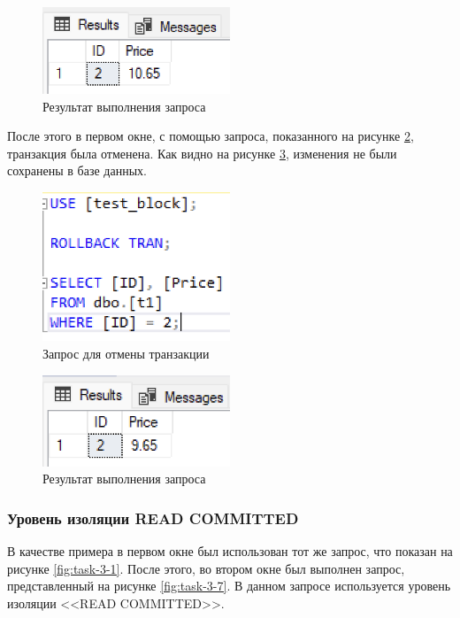 \documentclass[a4paper, 14pt]{extarticle}
\begin{document}
\begin{figure}[H]
  \centering
  \includegraphics[width=0.5\textwidth]{images/task-3/4.png}
  \caption{Результат выполнения запроса}
  \label{fig:task-3-4}
\end{figure}

После этого в первом окне, с помощью запроса, показанного на рисунке
\ref{fig:task-3-5}, транзакция была отменена. Как видно на рисунке
\ref{fig:task-3-6}, изменения не были сохранены в базе данных.

\begin{figure}[H]
  \centering
  \includegraphics[width=0.5\textwidth]{images/task-3/5.png}
  \caption{Запрос для отмены транзакции}
  \label{fig:task-3-5}
\end{figure}

\begin{figure}[H]
  \centering
  \includegraphics[width=0.5\textwidth]{images/task-3/6.png}
  \caption{Результат выполнения запроса}
  \label{fig:task-3-6}
\end{figure}

\subsubsection{Уровень изоляции READ COMMITTED}

В качестве примера в первом окне был использован тот же запрос, что показан на
рисунке \ref{fig:task-3-1}. После этого, во втором окне был выполнен запрос,
представленный на рисунке \ref{fig:task-3-7}. В данном запросе используется
уровень изоляции <<\foreignlanguage{english}{READ COMMITTED}>>. 
\end{document}
